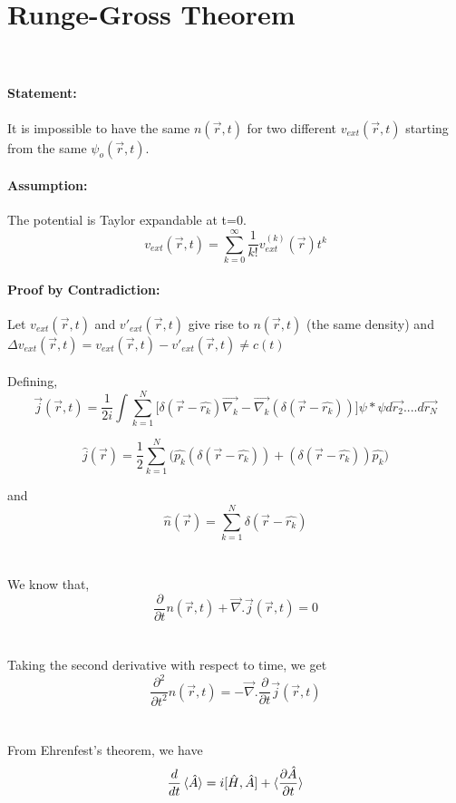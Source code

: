 \documentclass[12pt]{article}
\begin{document}
\section{Runge-Gross Theorem}
\\
\paragraph{Statement:} It is impossible to have the same $n(\vec{r},t)$ for two different 
$v_{ext}(\vec{r},t)$ starting from the same $\psi_{o}(\vec{r},t)$.

\paragraph{Assumption:} The potential is Taylor expandable at t=0. 
\[ v_{ext}(\vec{r},t) = \sum_{k=0}^{\infty} \frac{1}{k!} v_{ext}^{(k)} (\vec{r}) t^k\]

\paragraph{Proof by Contradiction:} Let $v_{ext}(\vec{r},t)$ and $v'_{ext}(\vec{r},t)$ give rise 
to $n(\vec{r},t)$ (the same density) and $\Delta v_{ext}(\vec{r},t) = v_{ext}(\vec{r},t) - v'_{ext}(\vec{r},t) \neq c(t)$
\\
\\
Defining, 
\[ \vec{j} (\vec{r},t) = \frac{1}{2i} \int \sum_{k=1}^{N} \Big[\delta(\vec{r} - \hat{r_k}) \vec{\nabla_k} - 
\vec{\nabla_k}(\delta(\vec{r} - \hat{r_k})) \Big] \psi* \psi d\vec{r_2}....d\vec{r_N}\]

\[ \hat{j}(\vec{r}) = \frac{1}{2} \sum_{k=1}^{N} \Big(\hat{p_k}(\delta(\vec{r} - \hat{r_k})) + 
(\delta(\vec{r} - \hat{r_k}))\hat{p_k} \Big)\]

and \[ \hat{n}(\vec{r}) = \sum_{k=1}^{N} \delta(\vec{r} - \hat{r_k})\]
\\
\\
We know that,
\[ \frac{\partial}{\partial t}n(\vec{r},t) + \vec{\nabla}.  \vec{j}(\vec{r},t) = 0\]
\\
\\
Taking the second derivative with respect to time, we get
\[ \frac{\partial^2}{\partial t^2}n(\vec{r},t) = -\vec{\nabla}.\frac{\partial}{\partial t}\vec{j}(\vec{r},t)\]
\\
\\
From Ehrenfest's theorem, we have 
\[ \frac{d}{dt}\braket{\hat{A}} = i [\hat{H},\hat{A}] + \braket{\frac{\partial \hat{A}}{\partial t}}\]
\end{document}
